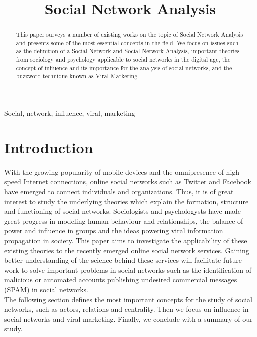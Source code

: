 \documentclass[conference,letterpaper]{IEEEtran}
\begin{document}
\title{\huge Social Network Analysis}

\author{
}

\maketitle
\begin{abstract}
This paper surveys a number of existing works on the topic of Social Network Analysis and presents some of the most essential concepts in the field.
We focus on issues such as the definition of a Social Network and Social Network Analysis, important theories from sociology and psychology applicable
to social networks in the digital age, the concept of influence and its importance for the analysis of social networks, and the buzzword technique
known as Viral Marketing.
\\
\end{abstract}

\begin{keywords}
Social, network, influence, viral, marketing
\end{keywords}

\section{Introduction}
With the growing popularity of mobile devices and the omnipresence of high speed Internet connections,
online social networks such as Twitter and Facebook have emerged to connect individuals and organizations.
Thus, it is of great interest to study the underlying theories which explain the formation, structure and
functioning of social networks. Sociologists and psychologysts have made great progress in modeling human
behaviour and relationships, the balance of power and influence in groups and the ideas powering viral
information propagation in society. This paper aims to investigate the applicability of these existing
theories to the recently emerged online social network services.
Gaining better understanding of the science behind these services will facilitate future work to solve
important problems in social networks such as the identification of malicious or automated accounts
publishing undesired commercial messages (SPAM) in social networks.\\
\indent
The following section defines the most important concepts for the study of social networks, such as actors, relations and centrality.
Then we focus on influence in social networks and viral marketing. Finally, we conclude with a summary of our study.\\
\end{document}
